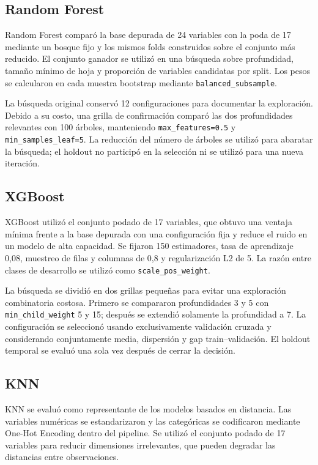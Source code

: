 \subsection{Random Forest}

Random Forest comparó la base depurada de 24 variables con la poda de 17
mediante un bosque fijo y los mismos folds construidos sobre el conjunto más
reducido. El conjunto ganador se utilizó en una búsqueda sobre profundidad,
tamaño mínimo de hoja y proporción de variables candidatas por split. Los
pesos se calcularon en cada muestra bootstrap mediante
\texttt{balanced\_subsample}.

La búsqueda original conservó 12 configuraciones para documentar la
exploración. Debido a su costo, una grilla de confirmación comparó las dos
profundidades relevantes con 100 árboles, manteniendo
\texttt{max\_features=0.5} y \texttt{min\_samples\_leaf=5}. La reducción del
número de árboles se utilizó para abaratar la búsqueda; el holdout no participó
en la selección ni se utilizó para una nueva iteración.

\subsection{XGBoost}

XGBoost utilizó el conjunto podado de 17 variables, que obtuvo una ventaja
mínima frente a la base depurada con una configuración fija y reduce el ruido
en un modelo de alta capacidad. Se fijaron 150 estimadores, tasa de aprendizaje
0,08, muestreo de filas y columnas de 0,8 y regularización L2 de 5. La razón
entre clases de desarrollo se utilizó como \texttt{scale\_pos\_weight}.

La búsqueda se dividió en dos grillas pequeñas para evitar una exploración
combinatoria costosa. Primero se compararon profundidades 3 y 5 con
\texttt{min\_child\_weight} 5 y 15; después se extendió solamente la profundidad
a 7. La configuración se seleccionó usando exclusivamente validación cruzada
y considerando conjuntamente media, dispersión y gap train--validación. El
holdout temporal se evaluó una sola vez después de cerrar la decisión.

\subsection{KNN}

KNN se evaluó como representante de los modelos basados en distancia. Las
variables numéricas se estandarizaron y las categóricas se codificaron mediante
One-Hot Encoding dentro del pipeline. Se utilizó el conjunto podado de 17
variables para reducir dimensiones irrelevantes, que pueden degradar las
distancias entre observaciones.

